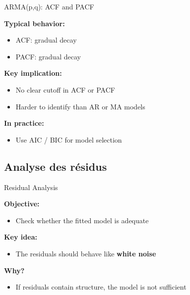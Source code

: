 \documentclass[aspectratio=169]{beamer}
\begin{document}
\begin{frame}{ARMA(p,q): ACF and PACF}

\textbf{Typical behavior:}

\begin{itemize}
    \item ACF: gradual decay
    \item PACF: gradual decay
\end{itemize}

\vspace{0.4cm}

\textbf{Key implication:}
\begin{itemize}
    \item No clear cutoff in ACF or PACF
    \item Harder to identify than AR or MA models
\end{itemize}

\vspace{0.4cm}

\textbf{In practice:}
\begin{itemize}
    \item Use AIC / BIC for model selection
\end{itemize}

\end{frame}


\subsection{Analyse des résidus}

\begin{frame}{Residual Analysis}

\textbf{Objective:}
\begin{itemize}
    \item Check whether the fitted model is adequate
\end{itemize}

\vspace{0.4cm}

\textbf{Key idea:}
\begin{itemize}
    \item The residuals should behave like \textbf{white noise}
\end{itemize}

\vspace{0.4cm}

\textbf{Why?}
\begin{itemize}
    \item If residuals contain structure, the model is not sufficient
\end{itemize}

\end{frame}
\end{document}
